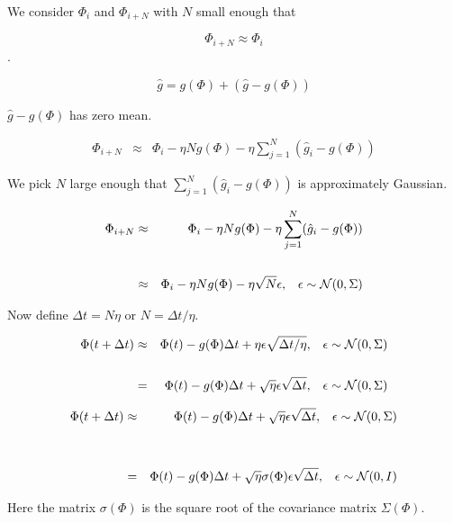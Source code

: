 {\vfill
We consider $\Phi_i$ and $\Phi_{i+N}$ with $N$ small enough that

$$\Phi_{i+N} \approx \Phi_i$$.


$$\hat{g} = g(\Phi) + (\hat{g} - g(\Phi))$$

\vfill
$\hat{g} - g(\Phi)$ has zero mean.

\begin{eqnarray*}
\Phi_{i+N} & \approx & \Phi_i - \eta N g(\Phi)  - \eta \sum_{j=1}^N (\hat{g}_i - g(\Phi))
\end{eqnarray*}

\vfill
We pick $N$ large enough that $\sum_{j=1}^N (\hat{g}_i - g(\Phi))$ is approximately Gaussian.


\begin{eqnarray*}
\Phi_{i+N} & \approx & \Phi_i - \eta N g(\Phi)  - \eta \sum_{j=1}^N (\hat{g}_i - g(\Phi)) \\
\\
& \approx & \Phi_i - \eta N g(\Phi)  - \eta \sqrt{N} \epsilon,\;\;\; \epsilon \sim {\cal N}(0,\Sigma)
\end{eqnarray*}

\vfill
Now define $\Delta t = N\eta$ or $N = \Delta t/\eta$.

\begin{eqnarray*}
\Phi(t+ \Delta t) & \approx & \Phi(t) - g(\Phi)\Delta t +  \eta\epsilon \sqrt{ \Delta t/\eta},\;\;\; \epsilon \sim {\cal N}(0,\Sigma) \\
\\
& = & \Phi(t) - g(\Phi)\Delta t +  \sqrt{\eta}\epsilon \sqrt{\Delta t},\;\;\; \epsilon \sim {\cal N}(0,\Sigma)
\end{eqnarray*}



\begin{eqnarray*}
\Phi(t+ \Delta t) & \approx & \Phi(t) - g(\Phi)\Delta t +  \sqrt{\eta}\epsilon \sqrt{ \Delta t},\;\;\; \epsilon \sim {\cal N}(0,\Sigma) \\
\\
\\
& = & \Phi(t) - g(\Phi)\Delta t +  \sqrt{\eta}\sigma(\Phi) \epsilon \sqrt{ \Delta t},\;\;\; \epsilon \sim {\cal N}(0,I) 
\end{eqnarray*}

\vfill
Here the matrix $\sigma(\Phi)$ is the square root of the covariance matrix $\Sigma(\Phi)$.

}
